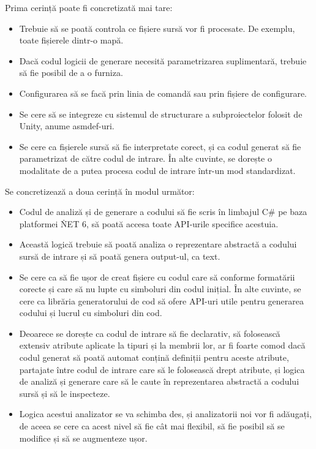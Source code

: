 \documentclass{report}
\begin{document}
Prima cerință poate fi concretizată mai tare:

\begin{itemize}
  \item Trebuie să se poată controla ce fișiere sursă vor fi procesate. De exemplu, toate fișierele dintr-o mapă.
  \item Dacă codul logicii de generare necesită parametrizarea suplimentară, trebuie să fie posibil de a o furniza.
  \item Configurarea să se facă prin linia de comandă sau prin fișiere de configurare.
  \item Se cere să se integreze cu sistemul de structurare a subproiectelor folosit de Unity, anume asmdef-uri.
  \item Se cere ca fișierele sursă să fie interpretate corect, și ca codul generat să fie parametrizat de către codul de intrare. În alte cuvinte, se dorește o modalitate de a putea procesa codul de intrare într-un mod standardizat.
\end{itemize}


Se concretizează a doua cerință în modul următor:

\begin{itemize}
  \item Codul de analiză și de generare a codului să fie scris în limbajul C\# pe baza platformei \. NET 6, să poată accesa toate API-urile specifice acestuia.
  \item Această logică trebuie să poată analiza o reprezentare abstractă a codului sursă de intrare și să poată genera output-ul, ca text.
  \item Se cere ca să fie ușor de creat fișiere cu codul care să conforme formatării corecte și care să nu lupte cu simboluri din codul inițial.
  În alte cuvinte, se cere ca librăria generatorului de cod să ofere API-uri utile pentru generarea codului și lucrul cu simboluri din cod.
  \item Deoarece se dorește ca codul de intrare să fie declarativ, să folosească extensiv atribute aplicate la tipuri și la membrii lor, ar fi foarte
  comod dacă codul generat să poată automat conțină definiții pentru aceste atribute, partajate între codul de intrare care să le folosească drept atribute,
  și logica de analiză și generare care să le caute în reprezentarea abstractă a codului sursă și să le inspecteze.
  \item Logica acestui analizator se va schimba des, și analizatorii noi vor fi adăugați, de aceea se cere ca acest nivel să fie cât mai flexibil, să fie posibil să se modifice și să se augmenteze ușor.
\end{itemize}
\end{document}
